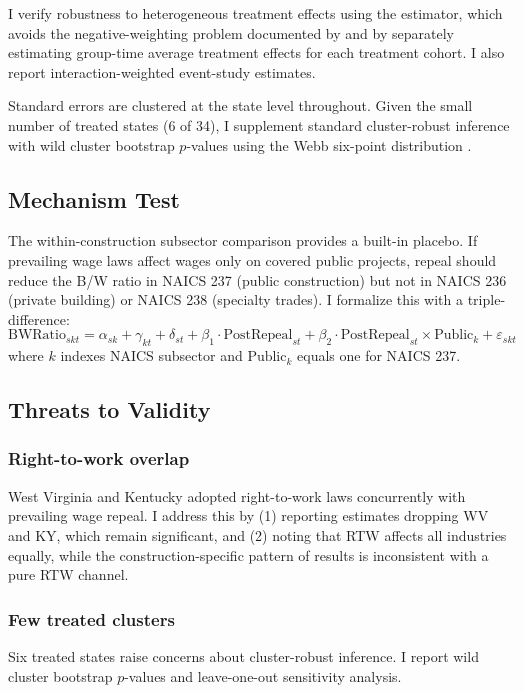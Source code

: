 \documentclass[12pt]{article}
\begin{document}
I verify robustness to heterogeneous treatment effects using the \citet{callaway2021difference} estimator, which avoids the negative-weighting problem documented by \citet{goodmanbacon2021difference} and \citet{dechaisemartin2020two} by separately estimating group-time average treatment effects for each treatment cohort. I also report \citet{sun2021estimating} interaction-weighted event-study estimates.

Standard errors are clustered at the state level throughout. Given the small number of treated states (6 of 34), I supplement standard cluster-robust inference with wild cluster bootstrap $p$-values using the Webb six-point distribution \citep{cameron2008bootstrap}.

\subsection{Mechanism Test}

The within-construction subsector comparison provides a built-in placebo. If prevailing wage laws affect wages only on covered public projects, repeal should reduce the B/W ratio in NAICS 237 (public construction) but not in NAICS 236 (private building) or NAICS 238 (specialty trades). I formalize this with a triple-difference:
\begin{equation}
\text{BWRatio}_{skt} = \alpha_{sk} + \gamma_{kt} + \delta_{st} + \beta_1 \cdot \text{PostRepeal}_{st} + \beta_2 \cdot \text{PostRepeal}_{st} \times \text{Public}_k + \varepsilon_{skt}
\label{eq:triple}
\end{equation}
where $k$ indexes NAICS subsector and $\text{Public}_k$ equals one for NAICS 237.

\subsection{Threats to Validity}

\subsubsection*{Right-to-work overlap} West Virginia and Kentucky adopted right-to-work laws concurrently with prevailing wage repeal. I address this by (1) reporting estimates dropping WV and KY, which remain significant, and (2) noting that RTW affects all industries equally, while the construction-specific pattern of results is inconsistent with a pure RTW channel.

\subsubsection*{Few treated clusters} Six treated states raise concerns about cluster-robust inference. I report wild cluster bootstrap $p$-values and leave-one-out sensitivity analysis.
\end{document}
